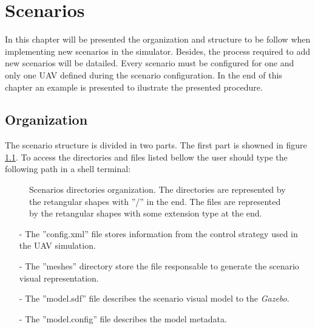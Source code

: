 
\chapter{Scenarios}
\label{Scenario}

In this chapter will be presented the organization and structure to be follow when implementing new scenarios in the simulator. Besides, the process required to add new scenarios will be datailed. Every scenario must be configured for one and only one UAV defined during the scenario configuration. In the end of this chapter an example is presented to ilustrate the presented procedure.


\section{Organization}

The scenario structure is divided in two parts. The first part is showned in figure \ref{cenario1}. To access the directories and files listed bellow the user should type the following path in a shell terminal:

	
	\begin{figure}[H]
		\center
		\caption{Scenarios directories organization. The directories are represented by the retangular shapes with ''/'' in the end. The files are represented by the retangular shapes with some extension type at the end.}
		\label{cenario1}
	\end{figure}
	
	\begin{itemize}
		\itemsep0em 
		\item[-]The ''config.xml'' file stores information from the control strategy used in the UAV simulation.
		\item[-]The ''meshes'' directory store the file responsable to generate the scenario visual representation.
		\item[-]The ''model.sdf'' file describes the scenario visual model to the \textit{Gazebo}.
		\item[-]The ''model.config'' file describes the model metadata.
	\end{itemize}
	
